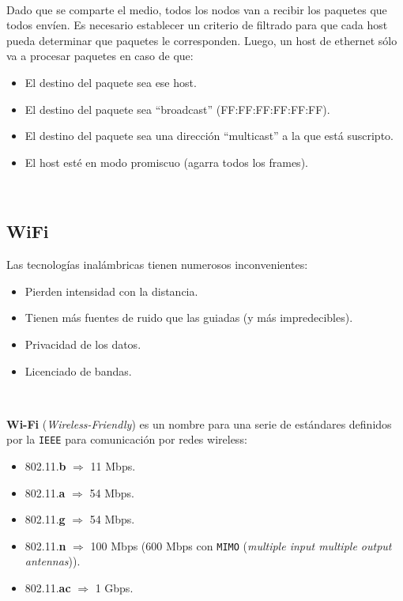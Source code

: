 \documentclass[]{article}
\begin{document}
~\newline

Dado que se comparte el medio, todos los nodos van a recibir los paquetes que todos envíen. Es necesario establecer un criterio de filtrado para que cada host pueda determinar que paquetes le corresponden. Luego, un host de ethernet sólo va a procesar paquetes en caso de que:
\begin{itemize}
    \item El destino del paquete sea ese host.
    \item El destino del paquete sea ``broadcast'' (FF:FF:FF:FF:FF:FF).
    \item El destino del paquete sea una dirección ``multicast'' a la que está suscripto.
    \item El host esté en modo promiscuo (agarra todos los frames).
\end{itemize}

~\newline

\subsection{WiFi}

Las tecnologías inalámbricas tienen numerosos inconvenientes:
\begin{itemize}
    \item Pierden intensidad con la distancia.
    \item Tienen más fuentes de ruido que las guiadas (y más impredecibles).
    \item Privacidad de los datos.
    \item Licenciado de bandas.
\end{itemize}

~\newline

\textbf{Wi-Fi} (\emph{Wireless-Friendly}) es un nombre para una serie de estándares definidos por la \texttt{IEEE} para comunicación por redes wireless:
\begin{itemize}
    \item 802.11.\textbf{b} $\Rightarrow$ 11 Mbps.
    \item 802.11.\textbf{a} $\Rightarrow$ 54 Mbps.
    \item 802.11.\textbf{g} $\Rightarrow$ 54 Mbps.
    \item 802.11.\textbf{n} $\Rightarrow$ 100 Mbps (600 Mbps con \texttt{MIMO} (\emph{multiple input multiple output antennas})).
    \item 802.11.\textbf{ac} $\Rightarrow$ 1 Gbps.
\end{itemize}
\end{document}
